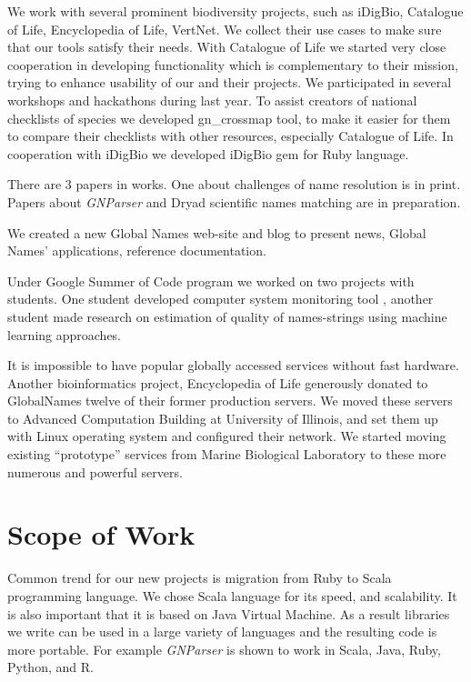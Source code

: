 \documentclass[11pt]{article}
\begin{document}
We work with several prominent biodiversity projects, such as iDigBio,
Catalogue of Life, Encyclopedia of Life, VertNet. We collect their use cases to
make sure that our tools satisfy their needs. With Catalogue of Life we started
very close cooperation in developing functionality which is complementary to
their mission, trying to enhance usability of our and their projects. We
participated in several workshops and hackathons during last year.  To assist
creators of national checklists of species we developed gn\_crossmap
\cite{gn-crossmap} tool, to make it easier for them to compare their checklists
with other resources, especially Catalogue of Life. In cooperation with iDigBio
we developed iDigBio gem \cite{gn-idigbio} for Ruby language.


There are 3 papers in works. One about challenges of name resolution
\cite{Patterson:inpress-a} is in
print. Papers about \textit{GNParser} \cite{Mozzherin:inpress-a} and Dryad
scientific names matching are in preparation.

We created a new Global Names web-site and blog \cite{globalnames-web} to
present news, Global Names' applications, reference documentation.

Under Google Summer of Code program we worked on two projects with students.
One student developed computer system monitoring tool \cite{sysopia}, another
student made research on estimation of quality of names-strings using machine
learning approaches.

It is impossible to have popular globally accessed services without fast
hardware. Another bioinformatics project, Encyclopedia of Life \cite{eol}
generously donated to GlobalNames twelve of their former production servers. We
moved these servers to Advanced Computation Building at University of Illinois,
and set them up with Linux operating system and configured their network.  We
started moving existing ``prototype'' services from Marine Biological
Laboratory to these more numerous and powerful servers.

\section{Scope of Work}

Common trend for our new projects is migration from Ruby to Scala programming
language. We chose Scala language for its speed, and scalability. It is also
important that it is based on Java Virtual Machine. As a result libraries we
write can be used in a large variety of languages and the resulting code is
more portable. For example \textit{GNParser} is shown to work in Scala, Java,
Ruby, Python, and R.
\end{document}

